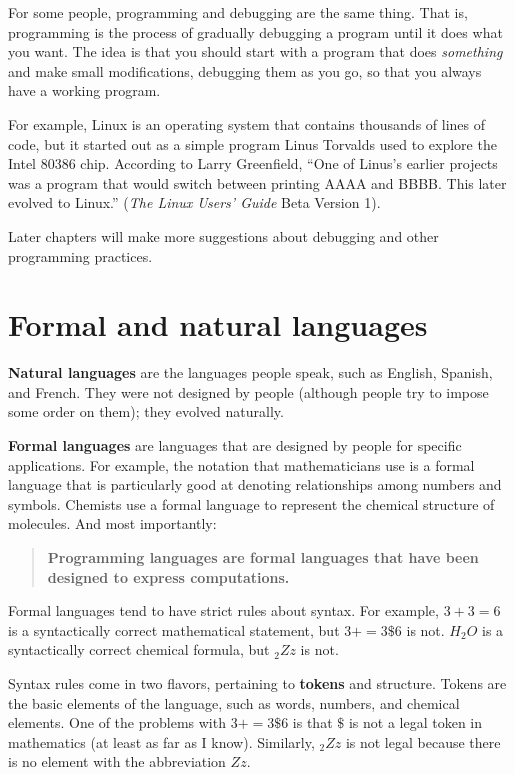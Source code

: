\documentclass[10pt]{book}
\begin{document}
For some people, programming and debugging are the same thing.  That
is, programming is the process of gradually debugging a program until
it does what you want.  The idea is that you should start with a
program that does {\em something} and make small modifications,
debugging them as you go, so that you always have a working program.

For example, Linux is an operating system that contains thousands of
lines of code, but it started out as a simple program Linus Torvalds
used to explore the Intel 80386 chip.  According to Larry Greenfield,
``One of Linus's earlier projects was a program that would switch
between printing AAAA and BBBB.  This later evolved to Linux.''
({\em The Linux Users' Guide} Beta Version 1).

Later chapters will make more suggestions about debugging and other
programming practices.


\section{Formal and natural languages}

{\bf Natural languages} are the languages people speak,
such as English, Spanish, and French.  They were not designed
by people (although people try to impose some order on them);
they evolved naturally.

{\bf Formal languages} are languages that are designed by people for
specific applications.  For example, the notation that mathematicians
use is a formal language that is particularly good at denoting
relationships among numbers and symbols.  Chemists use a formal
language to represent the chemical structure of molecules.  And
most importantly:

\begin{quote}
{\bf Programming languages are formal languages that have been
designed to express computations.}
\end{quote}

Formal languages tend to have strict rules about syntax.  For example,
$3 + 3 = 6$ is a syntactically correct mathematical statement, but 
$3 + = 3 \mbox{\$} 6$ is not.
$H_2O$ is a syntactically correct
chemical formula, but $_2Zz$ is not.

Syntax rules come in two flavors, pertaining to {\bf tokens} and
structure.  Tokens are the basic elements of the language, such as
words, numbers, and chemical elements.  One of the problems with
$3 + = 3 \mbox{\$} 6$ is that \( \$ \) is not a legal token in mathematics
(at least as far as I know).  Similarly, $_2Zz$ is not legal because
there is no element with the abbreviation $Zz$.
\end{document}
